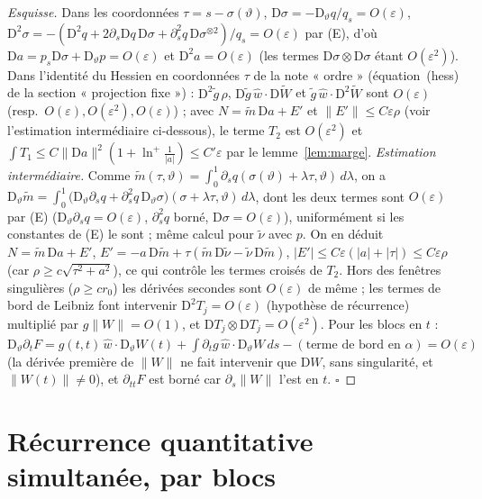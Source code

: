 \documentclass[11pt,a4paper]{article}
\theoremstyle{remark}
\newcommand{\vth}{\vartheta}
\newcommand{\D}{\mathrm D}
\begin{document}
\begin{proof}[Esquisse]
Dans les coordonnées $\tau=s-\sigma(\vth)$, $\D\sigma=-\D_\vth q/q_s=O(\varepsilon)$, $\D^2\sigma=-(\D^2q+2\partial_s\D q\,\D\sigma+\partial_s^2q\,\D\sigma^{\otimes2})/q_s=O(\varepsilon)$ par (E), d'où $\D a=p_s\D\sigma+\D_\vth p=O(\varepsilon)$ et $\D^2a=O(\varepsilon)$ (les termes $\D\sigma\otimes\D\sigma$ étant $O(\varepsilon^2)$). Dans l'identité du Hessien en coordonnées $\tau$ de la note « ordre » (équation~(hess) de la section « projection fixe ») : $\D^2\tilde g\,\rho$, $\D\tilde g\,\hat w\!\cdot\!\D\tilde W$ et $\tilde g\,\hat w\!\cdot\!\D^2\tilde W$ sont $O(\varepsilon)$ (resp.\ $O(\varepsilon),O(\varepsilon^2),O(\varepsilon)$) ; avec $N=\tilde m\,\D a+E'$ et $\lVert E'\rVert\le C\varepsilon\rho$ (voir l'estimation intermédiaire ci-dessous), le terme $T_2$ est $O(\varepsilon^2)$ et $\int T_1\le C\lVert\D a\rVert^2(1+\ln^+\frac1{\lvert a\rvert})\le C'\varepsilon$ par le lemme~\ref{lem:marge}. \emph{Estimation intermédiaire.} Comme $\tilde m(\tau,\vth)=\int_0^1\partial_sq(\sigma(\vth)+\lambda\tau,\vth)\,d\lambda$, on a $\D_\vth\tilde m=\int_0^1\bigl(\D_\vth\partial_sq+\partial_s^2q\,\D_\vth\sigma\bigr)(\sigma+\lambda\tau,\vth)\,d\lambda$, dont les deux termes sont $O(\varepsilon)$ par (E) ($\D_\vth\partial_sq=O(\varepsilon)$, $\partial_s^2q$ borné, $\D\sigma=O(\varepsilon)$), uniformément si les constantes de (E) le sont ; même calcul pour $\tilde\nu$ avec $p$. On en déduit $N=\tilde m\,\D a+E'$, $E'=-a\,\D\tilde m+\tau(\tilde m\,\D\tilde\nu-\tilde\nu\,\D\tilde m)$, $\lvert E'\rvert\le C\varepsilon(\lvert a\rvert+\lvert\tau\rvert)\le C\varepsilon\rho$ (car $\rho\ge c\sqrt{\tau^2+a^2}$), ce qui contrôle les termes croisés de $T_2$. Hors des fenêtres singulières ($\rho\ge cr_0$) les dérivées secondes sont $O(\varepsilon)$ de même ; les termes de bord de Leibniz font intervenir $\D^2T_j=O(\varepsilon)$ (hypothèse de récurrence) multiplié par $g\lVert W\rVert=O(1)$, et $\D T_j\otimes\D T_j=O(\varepsilon^2)$. Pour les blocs en $t$ : $\D_\vth\partial_tF=g(t,t)\,\hat w\!\cdot\!\D_\vth W(t)+\int\partial_tg\,\hat w\!\cdot\!\D_\vth W\,ds-(\text{terme de bord en }\alpha)=O(\varepsilon)$ (la dérivée première de $\lVert W\rVert$ ne fait intervenir que $\D W$, sans singularité, et $\lVert W(t)\rVert\ne0$), et $\partial_{tt}F$ est borné car $\partial_s\lVert W\rVert$ l'est en $t$. $\square$
\end{proof}

\section{Récurrence quantitative simultanée, par blocs}\label{sec:rec}
\end{document}
